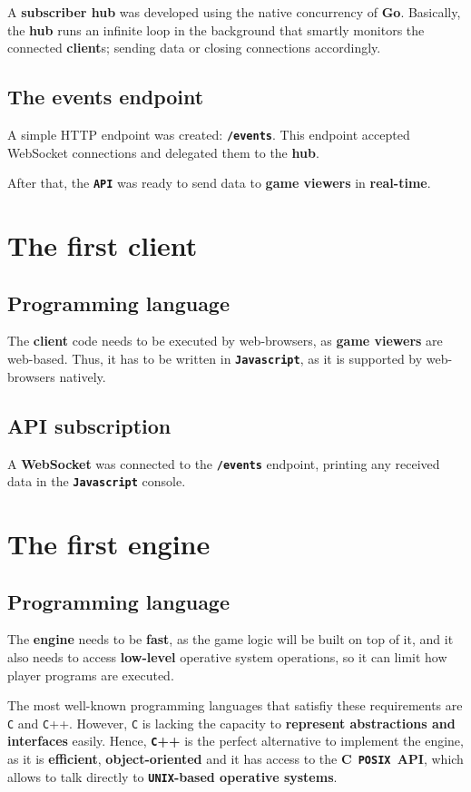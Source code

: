 \documentclass[a4paper,11pt,titlepage,abstract,numbers=noenddot,automark,mnsy,intlimits,rgb,dvipsnames]{report}
\begin{document}
A \textbf{subscriber hub} was developed using the native concurrency of \textbf{Go}. Basically, the \textbf{hub} runs an infinite loop in the
background that smartly monitors the connected \textbf{client}s; sending data or closing connections accordingly.
\subsection{The events endpoint}
A simple HTTP endpoint was created: \textbf{\texttt{/events}}. This endpoint accepted WebSocket connections and delegated them to the
\textbf{hub}.

After that, the \textbf{\texttt{API}} was ready to send data to \textbf{game viewers} in \textbf{real-time}.
\section{The first client}
\subsection{Programming language}
The \textbf{client} code needs to be executed by web-browsers, as \textbf{game viewers} are web-based.
Thus, it has to be written in \textbf{\texttt{Javascript}}, as it is supported by web-browsers natively.
\subsection{API subscription}
A \textbf{WebSocket} was connected to the \textbf{\texttt{/events}} endpoint, printing any received data in the \textbf{\texttt{Javascript}} console.
\section{The first engine}
\subsection{Programming language}
The \textbf{engine} needs to be \textbf{fast}, as the game logic will be built on top of it, and it also needs to access
\textbf{low-level} operative system operations, so it can limit how player programs are executed.

The most well-known programming languages that satisfiy these requirements are \texttt{C} and \texttt{C}++. However, \texttt{C}  is lacking
the capacity to \textbf{represent abstractions and interfaces} easily. Hence, \textbf{\texttt{C}++} is the perfect alternative to implement
the engine, as it is \textbf{efficient}, \textbf{object-oriented} and it has access to the \textbf{\texttt{}C\texttt{ POSIX }API\texttt{}}, which allows to talk
directly to \textbf{\texttt{UNIX}-based operative systems}.
\end{document}
